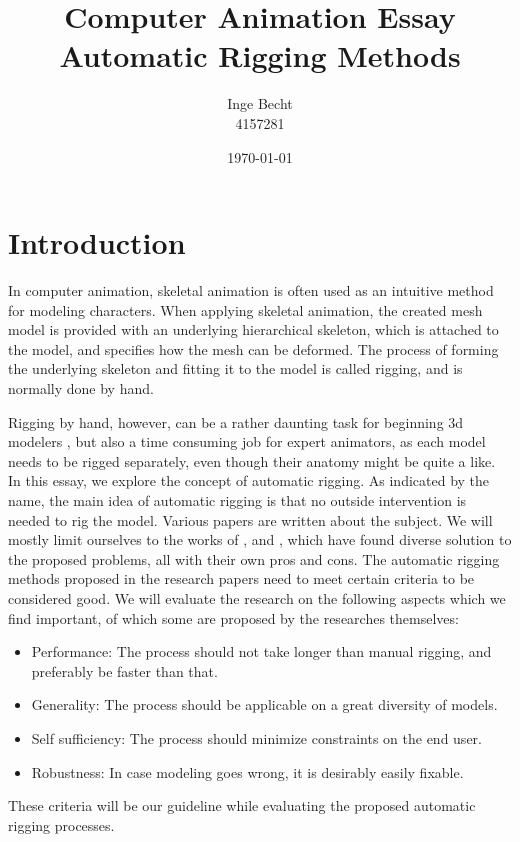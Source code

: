 \documentclass{article}
\title{Computer Animation Essay\\ Automatic Rigging Methods}
\author{Inge Becht\\ 4157281}
\date{\today}
\begin{document}
\maketitle

\section{Introduction}
In computer animation, skeletal animation is often used as an intuitive method
for modeling characters. When applying skeletal animation, the created mesh
model is provided with an underlying hierarchical skeleton, which is attached to
the model, and specifies how the mesh can be deformed. The process of forming
the underlying skeleton and fitting it to the model is called rigging, and is
normally done by hand. 

Rigging by hand, however, can be a rather daunting task for beginning 3d
modelers \citep{paper1}, but also a time consuming job for expert animators, as
each model needs to be rigged separately, even though their anatomy might be
quite a like.
In this essay, we explore the concept of automatic rigging. As indicated by the
name, the main idea of automatic rigging is that no outside intervention is
needed to rig the model.
Various papers are written about the subject. We will mostly limit ourselves to
the works of \citep{paper1}, \citep{paper2} and \citep{paper3}, which have found
diverse solution to the proposed problems, all with their own pros and cons.
The automatic rigging methods proposed in the research papers need to meet
certain criteria to be considered good. We will evaluate the research on the
following aspects which we find important, of which some are proposed by the
researches themselves:

\begin{itemize}
\item Performance: The process should not take longer than manual rigging, and
    preferably be faster than that.
\item Generality: The process should be applicable on a great diversity of models.
\item Self sufficiency: The process should minimize constraints on the end user.
\item Robustness: In case modeling goes wrong, it is desirably easily fixable.
\end{itemize}
These criteria will be our guideline while evaluating the proposed automatic rigging processes.
\end{document}
